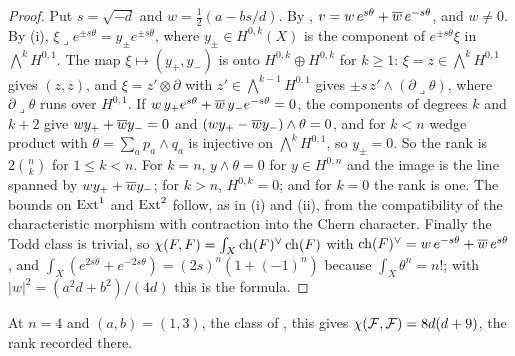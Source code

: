 \begin{proof}
Put $s=\sqrt{-d}$ and $w=\frac12(a-bs/d)$. By \cite[Theorem~14.5(i)]{paperI},
$v=w\,e^{s\theta}+\overline{w}\,e^{-s\theta}$, and $w\ne0$. By
(i), $\xi\lrcorner e^{\pm s\theta}=y_{\pm}e^{\pm s\theta}$,
where $y_{\pm}\in H^{0,k}(X)$ is the component of $e^{\pm s\theta}\xi$ in
$\bigwedge^{k}H^{0,1}$. The map $\xi\mapsto(y_{+},y_{-})$ is onto
$H^{0,k}\oplus H^{0,k}$ for $k\ge1$: $\xi=z\in\bigwedge^{k}H^{0,1}$ gives
$(z,z)$, and $\xi=z'\otimes\partial$ with $z'\in\bigwedge^{k-1}H^{0,1}$ gives
$\pm s\,z'\wedge(\partial\lrcorner\theta)$, where $\partial\lrcorner\theta$ runs
over $H^{0,1}$. If $w\,y_{+}e^{s\theta}+\overline{w}\,y_{-}e^{-s\theta}=0$, the
components of degrees $k$ and $k+2$ give $wy_{+}+\overline{w}y_{-}=0$ and
$(wy_{+}-\overline{w}y_{-})\wedge\theta=0$, and for $k<n$ wedge product with
$\theta=\sum_{a}p_{a}\wedge q_{a}$ is injective on $\bigwedge^{k}H^{0,1}$, so
$y_{\pm}=0$. So the rank is $2\binom{n}{k}$ for $1\le k<n$. For $k=n$,
$y\wedge\theta=0$ for $y\in H^{0,n}$ and the image is the line spanned by
$wy_{+}+\overline{w}y_{-}$; for $k>n$, $H^{0,k}=0$; and for $k=0$ the rank is one.
The bounds on $\operatorname{Ext}^{1}$ and $\operatorname{Ext}^{2}$ follow, as in (i)
and (ii), from the compatibility of the characteristic morphism with
contraction into the Chern character. Finally the Todd class
is trivial, so $\chi(F,F)=\int_{X}\operatorname{ch}(F)^{\vee}\operatorname{ch}(F)$ with
$\operatorname{ch}(F)^{\vee}=w\,e^{-s\theta}+\overline{w}\,e^{s\theta}$, and
$\int_{X}(e^{2s\theta}+e^{-2s\theta})=(2s)^{n}(1+(-1)^{n})$ because
$\int_{X}\theta^{n}=n!$; with $|w|^{2}=(a^{2}d+b^{2})/(4d)$ this is the
formula.
\end{proof}

At $n=4$ and $(a,b)=(1,3)$, the class of , this gives
$\chi(\mathcal{F},\mathcal{F})=8d(d+9)$, the rank recorded there.

